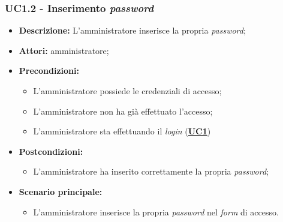 \subsubsection{UC1.2 - Inserimento \textit{password}}
\label{sec:UC1.2}
\begin{itemize}
	\item \textbf{Descrizione:} L’amministratore inserisce la propria \textit{password};
	\item \textbf{Attori:} amministratore;
	\item \textbf{Precondizioni:} 
	\begin{itemize}
		\item L’amministratore possiede le credenziali di accesso;
		\item L’amministratore non ha già effettuato l’accesso;
		\item L’amministratore sta effettuando il \textit{login} (\hyperref[sec:UC1]{\textbf{UC1}})
	\end{itemize}
	\item \textbf{Postcondizioni:} 
	\begin{itemize}
		\item L’amministratore ha inserito correttamente la propria \textit{password};
	\end{itemize}
	\item \textbf{Scenario principale:} 
	\begin{itemize}
		\item L’amministratore inserisce la propria \textit{password} nel \textit{form} di accesso.
	\end{itemize}
\end{itemize}

